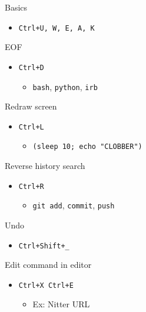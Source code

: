 \documentclass{beamer}
\begin{document}
\begin{frame}{Basics}
\begin{itemize}
	\item \texttt{Ctrl+U, W, E, A, K}
\end{itemize}
\end{frame}

\begin{frame}{EOF}
\begin{itemize}
	\item \texttt{Ctrl+D}
	\begin{itemize}
		\item \texttt{bash}, \texttt{python}, \texttt{irb}
	\end{itemize}
\end{itemize}
\end{frame}

\begin{frame}{Redraw screen}
\begin{itemize}
	\item \texttt{Ctrl+L}
	\begin{itemize}
		\item \texttt{(sleep 10; echo "CLOBBER")}
	\end{itemize}
\end{itemize}
\end{frame}

\begin{frame}{Reverse history search}
\begin{itemize}
	\item \texttt{Ctrl+R}
	\begin{itemize}
		\item \texttt{git add}, \texttt{commit}, \texttt{push}
	\end{itemize}
\end{itemize}
\end{frame}

\begin{frame}[fragile]{Undo}
\begin{itemize}
	\item \texttt{Ctrl+Shift+\_}
\end{itemize}
\end{frame}

\begin{frame}[fragile]{Edit command in editor}
\begin{itemize}
	\item \texttt{Ctrl+X Ctrl+E}
	\begin{itemize}
		\item Ex: Nitter URL
	\end{itemize}
\end{itemize}
\end{frame}
\end{document}
